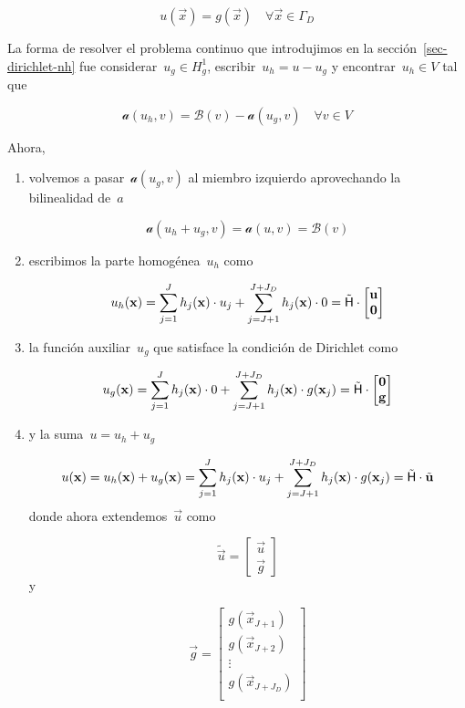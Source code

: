 \documentclass[
  12pt,
  a4paper,
  table]{scrbook}
\theoremstyle{plain}
\theoremstyle{definition}
\theoremstyle{plain}
\theoremstyle{plain}
\theoremstyle{remark}
\begin{document}
\[
u(\vec{x}) = g(\vec{x}) \quad \forall \vec{x} \in \Gamma_D
\]

La forma de resolver el problema continuo que introdujimos en la
sección~\ref{sec-dirichlet-nh} fue considerar~\(u_g \in H_g^1\),
escribir~\(u_h = u - u_g\) y encontrar~\(u_h \in V\) tal que

\[
\mathcal{a}(u_h,v) = \mathcal{B}(v) - \mathcal{a}(u_g,v) \quad \forall v \in V
\]

Ahora,

\begin{enumerate}
\def\labelenumi{\arabic{enumi}.}
\item
  volvemos a pasar~\(\mathcal{a}(u_g,v)\) al miembro izquierdo
  aprovechando la bilinealidad de~\(a\)

  \[
  \mathcal{a}(u_h+u_g,v) = \mathcal{a}(u,v) = \mathcal{B}(v)
  \]
\item
  escribimos la parte homogénea~\(u_h\) como

  \[
  u_h(\mathbf{x}) = \sum_{j=1}^{J} h_j(\mathbf{x}) \cdot u_j + \sum_{j=J+1}^{J+J_D} h_j(\mathbf{x}) \cdot 0
  = \tilde{\mathsf{H}} \cdot \begin{bmatrix} \mathbf{u} \\ \mathbf{0} \end{bmatrix}
  \]
\item
  la función auxiliar~\(u_g\) que satisface la condición de Dirichlet
  como

  \[
  u_g(\mathbf{x}) = \sum_{j=1}^{J} h_j(\mathbf{x}) \cdot 0 + \sum_{j=J+1}^{J+J_D} h_j(\mathbf{x}) \cdot g(\mathbf{x}_j)
  = \tilde{\mathsf{H}} \cdot \begin{bmatrix} \mathbf{0} \\ \mathbf{g} \end{bmatrix}
  \]
\item
  y la suma~\(u=u_h+u_g\)

  \[
  u(\mathbf{x}) = u_h(\mathbf{x}) + u_g(\mathbf{x}) = \sum_{j=1}^{J} h_j(\mathbf{x}) \cdot u_j + \sum_{j=J+1}^{J+J_D} h_j(\mathbf{x}) \cdot g(\mathbf{x}_j)
  = \tilde{\mathsf{H}} \cdot \tilde{\mathbf{u}}
  \] donde ahora extendemos~\(\vec{u}\) como

  \[
  \tilde{\vec{u}} =
  \begin{bmatrix}
  \vec{u} \\
  \vec{g}
  \end{bmatrix}
  \] y

  \[
  \vec{g} =
  \begin{bmatrix}
  g(\vec{x}_{J+1}) \\
  g(\vec{x}_{J+2}) \\
  \vdots \\
  g(\vec{x}_{J+J_D}) \\
  \end{bmatrix}
  \]
\end{enumerate}
\end{document}

